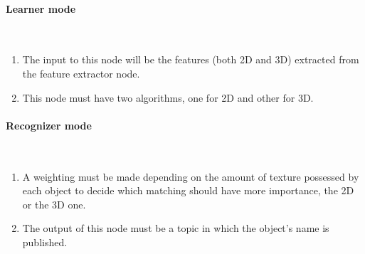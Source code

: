 	\paragraph{Learner mode}\mbox{}\\

	   \begin{enumerate}[label=\textbf{FR\threedigits*}, leftmargin=2cm]
  \setcounter{enumi}{\value{saveenum}}
	\item The input to this node will be the features (both 2D and 3D) extracted from the feature extractor node. 
	\item This node must have two algorithms, one for 2D and other for 3D. 
	   \setcounter{saveenum}{\value{enumi}}
\end{enumerate}
	\paragraph{Recognizer mode}\mbox{}\\

	   \begin{enumerate}[label=\textbf{FR\threedigits*}, leftmargin=2cm]
  \setcounter{enumi}{\value{saveenum}}


	\item A weighting must be made depending on the amount of texture possessed by each object to decide which matching should have more importance, the 2D or the 3D one. 
	\item The output of this node must be a topic in which the object's name is published.
   \setcounter{saveenum}{\value{enumi}}
\end{enumerate}


